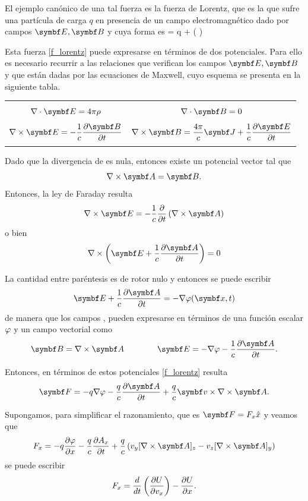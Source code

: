 \documentclass[10pt,oneside]{CBFT_book}
\begin{document}
El ejemplo canónico de una tal fuerza es la fuerza de Lorentz, que es la que sufre una partícula de carga $q$ en
presencia de un campo electromagnético dado por campos $\vb{E}, \vb{B}$ y cuya forma es
\be
	 = q  +  (  \times {} )
	\label{f_lorentz}
\ee

Esta fuerza \eqref{f_lorentz} puede expresarse en términos de dos potenciales. Para ello es necesario recurrir a
las relaciones que verifican los campos $\vb{E}, \vb{B}$ y que están dadas por las ecuaciones de Maxwell, cuyo esquema 
se presenta en la siguiente tabla.
\begin{center}
\begin{tabular}{|c|c|}
\hline
& \\
$ \nabla\cdot\vb{E} = 4 \pi \rho $ & $ \nabla \cdot \vb{B} = 0 $ \\
& \\
$ \displaystyle \rotorm{E} = -\frac{1}{c} \dpar{\vb{B}}{t} $ &  
$ \displaystyle \rotorm{B} = \frac{4\pi}{c}\vb{J} + \frac{1}{c} \dpar{\vb{E}}{t} $ \\
 & \\
\hline
\end{tabular}
\end{center}

Dado que la divergencia de  es nula, entonces existe un potencial vector  tal que 
\[
	\rotorm{A} = \vb{B}.
\]
Entonces, la ley de Faraday resulta 
\[
	\rotorm{E} = -\frac{1}{c} \dpar{}{t} \left(\rotorm{A} \right) 
\]
o bien 
\[
	\nabla\times\left( \vb{E} + \frac{1}{c}\dpar{\vb{A}}{t} \right) = 0
\]

La cantidad entre paréntesis es de rotor nulo y entonces se puede escribir
\[
	\vb{E} + \frac{1}{c}\dpar{\vb{A}}{t} = -\nabla \vp( \vb{x}, t )
\]
de manera que los campos ,  pueden expresarse en términos de una función escalar $\varphi$ y un campo vectorial
 como
\[
	\vb{B} = \rotorm{A} \qquad \qquad \vb{E} = - \nabla \vp - \frac{1}{c} \dpar{ \vb{A} }{t} .
\]

Entonces, en términos de estos potenciales \eqref{f_lorentz} resulta 
\[
	\vb{F} = -q\nabla \vp - \frac{q}{c} \dpar{ \vb{A} }{t} + \frac{q}{c} \vb{v} \times \rotorm{A}.
\]

Supongamos, para simplificar el razonamiento, que es $ \vb{F} = F_x \hat{x} $ y veamos que 
\[
	F_x = -q \dpar{ \vp }{ x } - \frac{q}{c} \dpar{ A_x }{t} + \frac{q}{c} \left( v_y [\rotorm{A}]_z - v_z [\rotorm{A}]_y \right)
\]
se puede escribir
\[
	F_x = \frac{d^{\hspace{-0.05em}} {}}{d {t}^{\hspace{-0.05em}}} \left( \frac{\partial^{\hspace{-0.05em}} {U}}{\partial {v_x}^{\hspace{-0.05em}}} \right)  -\frac{\partial^{\hspace{-0.05em}} {U}}{\partial {x}^{\hspace{-0.05em}}}.
\]
\end{document}
